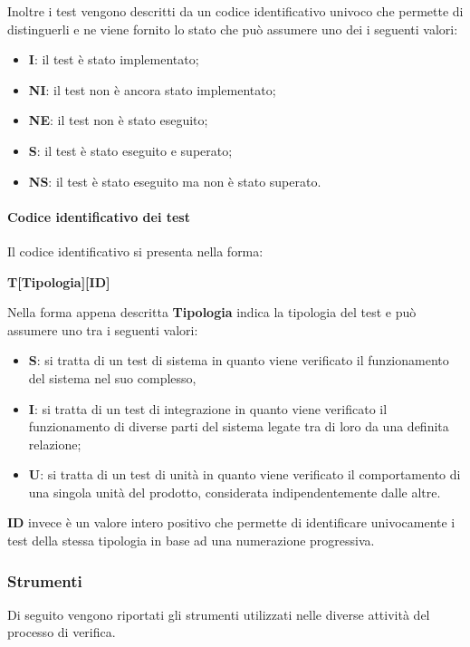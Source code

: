Inoltre i test vengono descritti da un codice identificativo univoco che permette di distinguerli e ne viene fornito lo stato che può 
assumere uno dei i seguenti valori:
\begin{itemize}
    \item \textbf{I}: il test è stato implementato;
    \item \textbf{NI}: il test non è ancora stato implementato;
    \item \textbf{NE}: il test non è stato eseguito;
    \item \textbf{S}: il test è stato eseguito e superato;
    \item \textbf{NS}: il test è stato eseguito ma non è stato superato.
\end{itemize}

\paragraph{Codice identificativo dei test}
Il codice identificativo si presenta nella forma:
\begin{center}
    \textbf{T[Tipologia][ID]}
\end{center}
Nella forma appena descritta \textbf{Tipologia} indica la tipologia del test e può assumere uno tra i seguenti valori:
\begin{itemize}
	\item \textbf{S}: si tratta di un test di sistema in quanto viene verificato il funzionamento del sistema nel suo complesso, 
	\item \textbf{I}: si tratta di un test di integrazione in quanto viene verificato il funzionamento di diverse parti del sistema legate 
		tra di loro da una definita relazione;
	\item \textbf{U}: si tratta di un test di unità in quanto viene verificato il comportamento di una singola unità del prodotto, 
		considerata indipendentemente dalle altre.
\end{itemize}

\textbf{ID} invece è un valore intero positivo che permette di identificare univocamente i test della stessa tipologia in base ad una 
numerazione progressiva.

\subsubsection{Strumenti}
\label{ssub:verifica:strumenti}

Di seguito vengono riportati gli strumenti utilizzati nelle diverse attività del processo di verifica.

